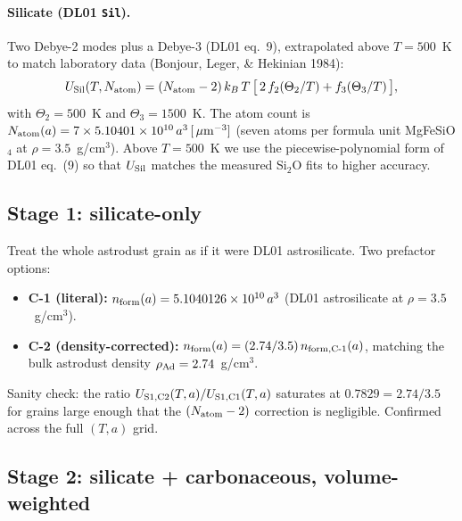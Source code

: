 \documentclass{my_memo}
\newcommand{\umass}{\ensuremath{\,\mu{\rm m}}}
\begin{document}
\paragraph{Silicate (DL01 \texttt{Sil}).}
Two Debye-2 modes plus a Debye-3 (DL01 eq.\ 9), extrapolated above
$T = 500$~K to match laboratory data (Bonjour, Leger, \& Hekinian
1984):
\begin{equation}
U_{\rm Sil}(T, N_{\rm atom}) = (N_{\rm atom}-2)\,k_B\,T\,
   \bigl[\,2\,f_2(\Theta_2/T) + f_3(\Theta_3/T)\,\bigr],
\end{equation}
with $\Theta_2 = 500$~K and $\Theta_3 = 1500$~K. The atom count is
$N_{\rm atom}(a) = 7 \times 5.10401\times10^{10}\,a^{3}\,[\umass^{-3}]$
(seven atoms per formula unit MgFeSiO$_4$ at $\rho = 3.5$~g/cm$^3$).
Above $T = 500$~K we use the piecewise-polynomial form of
DL01 eq.\ (9) so that $U_{\rm Sil}$ matches the measured Si$_2$O fits
to higher accuracy.

\subsection{Stage 1: silicate-only}

Treat the whole astrodust grain as if it were DL01 astrosilicate. Two
prefactor options:
\begin{itemize}
  \item \textbf{C-1 (literal):}
        $n_{\rm form}(a) = 5.1040126 \times 10^{10}\,a^3$
        (DL01 astrosilicate at $\rho = 3.5$~g/cm$^3$).
  \item \textbf{C-2 (density-corrected):}
        $n_{\rm form}(a) = (2.74/3.5)\,n_{\rm form, C\text{-}1}(a)$,
        matching the bulk astrodust density $\rho_{\rm Ad} = 2.74$~g/cm$^3$.
\end{itemize}
Sanity check: the ratio
$U_{\rm S1,C2}(T, a) / U_{\rm S1,C1}(T, a)$ saturates at $0.7829 =
2.74/3.5$ for grains large enough that the $(N_{\rm atom} - 2)$
correction is negligible. Confirmed across the full $(T, a)$ grid.

\subsection{Stage 2: silicate + carbonaceous, volume-weighted}
\end{document}

